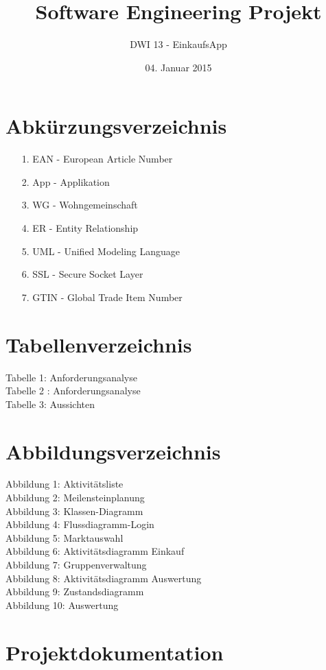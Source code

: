 \documentclass[12pt,a4paper]{article}
\begin{document}
\title{Software Engineering Projekt}
\author{DWI 13 - EinkaufsApp}
\date {04. Januar 2015}
\maketitle
\newpage
\tableofcontents
\newpage
\newpage
\section*{Abkürzungsverzeichnis}
\begin{itemize}
\item[1.] EAN - European Article Number
\item[2.] App - Applikation
\item[3.] WG - Wohngemeinschaft
\item[4.] ER - Entity Relationship
\item[5.] UML  - Unified Modeling Language
\item[6.] SSL - Secure Socket Layer 
\item[7.] GTIN - Global Trade Item Number
\end{itemize}
\newpage
\section*{Tabellenverzeichnis}
Tabelle 1: Anforderungsanalyse
\\
Tabelle 2 : Anforderungsanalyse
\\
Tabelle 3: Aussichten
\newpage
\section*{Abbildungsverzeichnis}
Abbildung 1: Aktivitätsliste
\\
Abbildung 2: Meilensteinplanung
\\
Abbildung 3: Klassen-Diagramm
\\
Abbildung 4: Flussdiagramm-Login
\\
Abbildung 5: Marktauswahl
\\
Abbildung 6: Aktivitätsdiagramm Einkauf
\\
Abbildung 7: Gruppenverwaltung
\\
Abbildung 8: Aktivitätsdiagramm Auswertung
\\
Abbildung 9: Zustandsdiagramm
\\
Abbildung 10: Auswertung

\newpage
\section*{Projektdokumentation}
\end{document}
